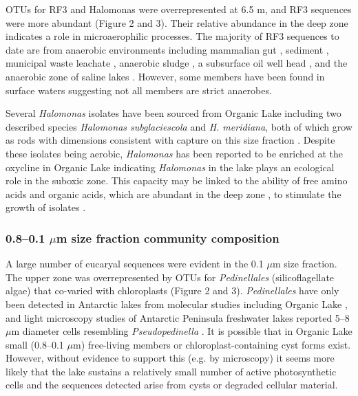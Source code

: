 \acp{OTU} for RF3 and Halomonas were overrepresented at 6.5 m, and RF3 sequences were more abundant (Figure 2 and 3). 
Their relative abundance in the deep zone indicates a role in microaerophilic processes. 
The majority of RF3 sequences to date are from anaerobic environments including mammalian gut \cite{Tajima1999, Ley2006, Samsudin2011}, sediment \cite{Yanagibayashi1999, Roske2012}, municipal waste leachate \cite{Huang2005}, anaerobic sludge \cite{Chouari2005, Goberna2009, Riviere2009, Tang2011}, a subsurface oil well head \cite{Yamane2011}, and the anaerobic zone of saline lakes \cite{Humayoun2003, Schmidtova2009, Bowman2000}. 
However, some members have been found in surface waters \cite{Demergasso2008, Xing2009, Yilmaz2012} suggesting not all members are strict anaerobes. 

Several \emph{Halomonas} isolates have been sourced from Organic Lake including two described species \emph{Halomonas subglaciescola} and \emph{H. meridiana}, both of which grow as rods with dimensions consistent with capture on this size fraction \cite{Franzmann1987a, James1990}. 
Despite these isolates being aerobic, \emph{Halomonas} has been reported to be enriched at the oxycline in Organic Lake \cite{James1994} indicating \emph{Halomonas} in the lake plays an ecological role in the suboxic zone. 
This capacity may be linked to the ability of free amino acids and organic acids, which are abundant in the deep zone \cite{Gibson1994}, to stimulate the growth of isolates \cite{Franzmann1987a}.

\subsubsection{0.8--0.1 $\mu$m size fraction community composition}
A large number of eucaryal sequences were evident in the 0.1 $\mu$m size fraction. 
The upper zone was overrepresented by \acp{OTU} for \emph{Pedinellales} (silicoflagellate algae) that co-varied with chloroplasts (Figure 2 and 3). 
\emph{Pedinellales} have only been detected in Antarctic lakes from molecular studies \cite{Unrein2005, Lauro2011} including Organic Lake \cite{Yau2011}, and light microscopy studies of Antarctic Peninsula freshwater lakes reported 5--8 $\mu$m diameter cells resembling \emph{Pseudopedinella} \cite{Unrein2005}. 
It is possible that in Organic Lake small (0.8–0.1 $\mu$m) free-living members or chloroplast-containing cyst forms \cite{Thomsen1988} exist. 
However, without evidence to support this (e.g. by microscopy) it seems more likely that the lake sustains a relatively small number of active photosynthetic cells and the sequences detected arise from cysts or degraded cellular material.

